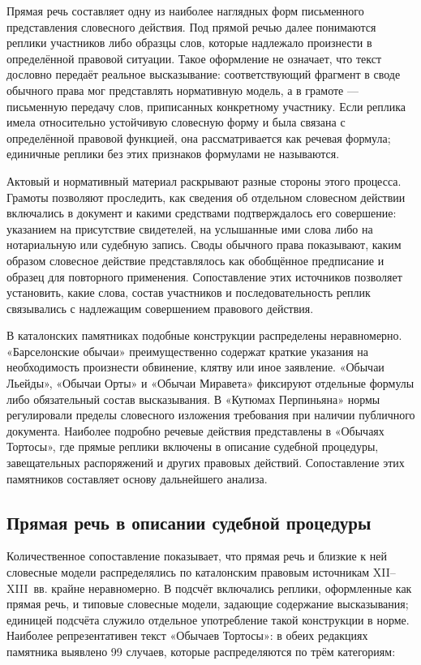 Прямая речь составляет одну из наиболее наглядных форм письменного представления словесного действия. Под прямой речью далее понимаются реплики участников либо образцы слов, которые надлежало произнести в определённой правовой ситуации. Такое оформление не означает, что текст дословно передаёт реальное высказывание: соответствующий фрагмент в своде обычного права мог представлять нормативную модель, а в грамоте --- письменную передачу слов, приписанных конкретному участнику. Если реплика имела относительно устойчивую словесную форму и была связана с определённой правовой функцией, она рассматривается как речевая формула; единичные реплики без этих признаков формулами не называются.

Актовый и нормативный материал раскрывают разные стороны этого процесса. Грамоты позволяют проследить, как сведения об отдельном словесном действии включались в документ и какими средствами подтверждалось его совершение: указанием на присутствие свидетелей, на услышанные ими слова либо на нотариальную или судебную запись. Своды обычного права показывают, каким образом словесное действие представлялось как обобщённое предписание и образец для повторного применения. Сопоставление этих источников позволяет установить, какие слова, состав участников и последовательность реплик связывались с надлежащим совершением правового действия.

В каталонских памятниках подобные конструкции распределены неравномерно. «Барселонские обычаи» преимущественно содержат краткие указания на необходимость произнести обвинение, клятву или иное заявление. «Обычаи Льейды», «Обычаи Орты» и «Обычаи Миравета» фиксируют отдельные формулы либо обязательный состав высказывания. В «Кутюмах Перпиньяна» нормы регулировали пределы словесного изложения требования при наличии публичного документа. Наиболее подробно речевые действия представлены в «Обычаях Тортосы», где прямые реплики включены в описание судебной процедуры, завещательных распоряжений и других правовых действий. Сопоставление этих памятников составляет основу дальнейшего анализа.

\subsection{Прямая речь в описании судебной процедуры}

Количественное сопоставление показывает, что прямая речь и близкие к ней словесные модели распределялись по каталонским правовым источникам XII--XIII~вв. крайне неравномерно. В подсчёт включались реплики, оформленные как прямая речь, и типовые словесные модели, задающие содержание высказывания; единицей подсчёта служило отдельное употребление такой конструкции в норме. Наиболее репрезентативен текст «Обычаев Тортосы»: в обеих редакциях памятника выявлено 99 случаев, которые распределяются по трём категориям:

